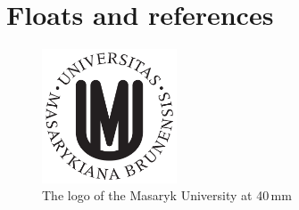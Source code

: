 \documentclass[
  digital, %
  table,   %
  lof,     %
  lot,     %
]{fithesis3}
\begin{document}
\chapter{Floats and references}
\begin{figure}
  \begin{center}
    \includegraphics[width=4cm]{fithesis/logo/mu/fithesis-base.pdf}
  \end{center}
  \caption{The logo of the Masaryk University at 40\,mm}
  \label{fig:mulogo1}
\end{figure}
\end{document}
